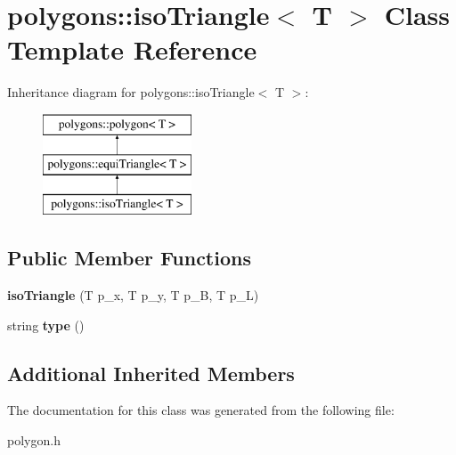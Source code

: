 \hypertarget{classpolygons_1_1isoTriangle}{\section{polygons\-:\-:iso\-Triangle$<$ T $>$ Class Template Reference}
\label{classpolygons_1_1isoTriangle}
}
Inheritance diagram for polygons\-:\-:iso\-Triangle$<$ T $>$\-:\begin{figure}[H]
\begin{center}
\leavevmode
\includegraphics[height=3.000000cm]{classpolygons_1_1isoTriangle}
\end{center}
\end{figure}
\subsection*{Public Member Functions}
\begin{DoxyCompactItemize}
\item 
\hypertarget{classpolygons_1_1isoTriangle_ac6bd6175e17aeb0fdefb661e41425f84}{{\bfseries iso\-Triangle} (T p\-\_\-x, T p\-\_\-y, T p\-\_\-\-B, T p\-\_\-\-L)}\label{classpolygons_1_1isoTriangle_ac6bd6175e17aeb0fdefb661e41425f84}

\item 
\hypertarget{classpolygons_1_1isoTriangle_adf469b12fabb63a710c8e77be5945ccc}{string {\bfseries type} ()}\label{classpolygons_1_1isoTriangle_adf469b12fabb63a710c8e77be5945ccc}

\end{DoxyCompactItemize}
\subsection*{Additional Inherited Members}


The documentation for this class was generated from the following file\-:\begin{DoxyCompactItemize}
\item 
polygon.\-h\end{DoxyCompactItemize}
